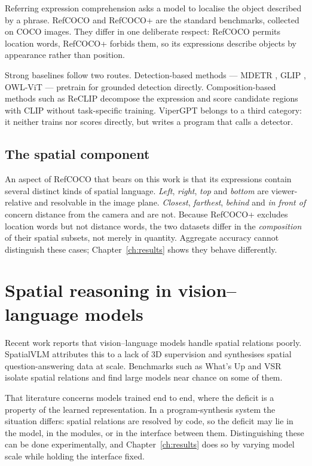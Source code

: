 \documentclass[12pt,a4paper,oneside]{report}
\begin{document}
Referring expression comprehension asks a model to localise the object described by a
phrase. RefCOCO and RefCOCO+ \cite{yu2016refcoco} are the standard benchmarks,
collected on COCO images. They differ in one deliberate respect: RefCOCO permits
location words, RefCOCO+ forbids them, so its expressions describe objects by
appearance rather than position.

Strong baselines follow two routes. Detection-based methods --- MDETR
\cite{kamath2021mdetr}, GLIP \cite{li2022glip}, OWL-ViT \cite{minderer2022owlvit} ---
pretrain for grounded detection directly. Composition-based methods such as ReCLIP
\cite{subramanian2022reclip} decompose the expression and score candidate regions with
CLIP without task-specific training. ViperGPT belongs to a third category: it neither
trains nor scores directly, but writes a program that calls a detector.

\subsection{The spatial component}

An aspect of RefCOCO that bears on this work is that its expressions contain several
distinct kinds of spatial language. \emph{Left}, \emph{right}, \emph{top} and
\emph{bottom} are viewer-relative and resolvable in the image plane. \emph{Closest},
\emph{farthest}, \emph{behind} and \emph{in front of} concern distance from the camera
and are not. Because RefCOCO+ excludes location words but not distance words, the two
datasets differ in the \emph{composition} of their spatial subsets, not merely in
quantity. Aggregate accuracy cannot distinguish these cases;
Chapter~\ref{ch:results} shows they behave differently.

\section{Spatial reasoning in vision--language models}

Recent work reports that vision--language models handle spatial relations poorly.
SpatialVLM \cite{chen2024spatialvlm} attributes this to a lack of 3D supervision and
synthesises spatial question-answering data at scale. Benchmarks such as What's Up
\cite{kamath2023whatsup} and VSR \cite{liu2023vsr} isolate spatial relations and find
large models near chance on some of them.

That literature concerns models trained end to end, where the deficit is a property of
the learned representation. In a program-synthesis system the situation differs:
spatial relations are resolved by code, so the deficit may lie in the model, in the
modules, or in the interface between them. Distinguishing these can be done
experimentally, and Chapter~\ref{ch:results} does so by varying model scale while
holding the interface fixed.
\end{document}
